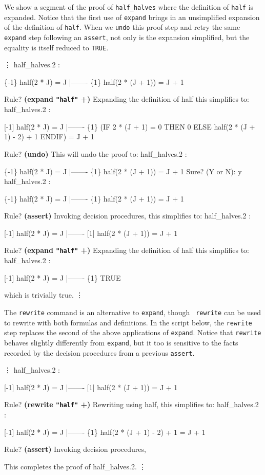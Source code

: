 We show a segment of the proof of {\tt half\_halves} where the
definition of {\tt half} is expanded.  Notice that the first use
of {\tt expand} brings in an unsimplified expansion of the definition of
{\tt half}.  When we {\tt undo} this proof step and retry the same
{\tt expand} step following an {\tt assert}, not only is the expansion
simplified, but the equality is itself reduced to {\tt TRUE}.  

\begin{pvsscript}
       \vdots
    half_halves.2 :   

    \{-1\}   half(2 * J) = J
      |-------
    \{1\}   half(2 * (J + 1)) = J + 1

    Rule? {\bf (expand {\tt "half"} +)}
    Expanding the definition of half
    this simplifies to: 
    half_halves.2 :   

    [-1]   half(2 * J) = J
      |-------
    \{1\}   (IF 2 * (J + 1) = 0 THEN 0 ELSE half(2 * (J + 1) - 2) + 1 ENDIF) = J + 1

    Rule? {\bf (undo)}
    This will undo the proof to: 
    half_halves.2 :   

    \{-1\}   half(2 * J) = J
      |-------
    \{1\}   half(2 * (J + 1)) = J + 1
    Sure? (Y or N): y
    half_halves.2 :   

    \{-1\}   half(2 * J) = J
      |-------
    \{1\}   half(2 * (J + 1)) = J + 1

    Rule? {\bf (assert)}
    Invoking decision procedures,
    this simplifies to: 
    half_halves.2 :   

    [-1]   half(2 * J) = J
      |-------
    [1]   half(2 * (J + 1)) = J + 1

    Rule? {\bf (expand {\tt "half"} +)}
    Expanding the definition of half
    this simplifies to: 
    half_halves.2 :   

    [-1]   half(2 * J) = J
      |-------
    \{1\}   TRUE

    which is trivially true.
       \vdots
\end{pvsscript}

The {\tt rewrite} command is an alternative to {\tt expand}, though {\tt
rewrite} can be used to rewrite with both formulas and definitions.  In
the script below, the {\tt rewrite} step replaces the second of the
above applications of {\tt expand}.  Notice that {\tt rewrite} behaves
slightly differently from {\tt expand}, but it too is sensitive to the
facts recorded by the decision procedures from a previous {\tt assert}.

\begin{pvsscript}
       \vdots
    half_halves.2 :   

    [-1]   half(2 * J) = J
      |-------
    [1]   half(2 * (J + 1)) = J + 1

    Rule? {\bf (rewrite {\tt "half"} +)}
    Rewriting using half,  
    this simplifies to: 
    half_halves.2 :   

    [-1]   half(2 * J) = J
      |-------
    \{1\}   half(2 * (J + 1) - 2) + 1 = J + 1

    Rule? {\bf (assert)}
    Invoking decision procedures,

    This completes the proof of half_halves.2.
       \vdots
\end{pvsscript}

